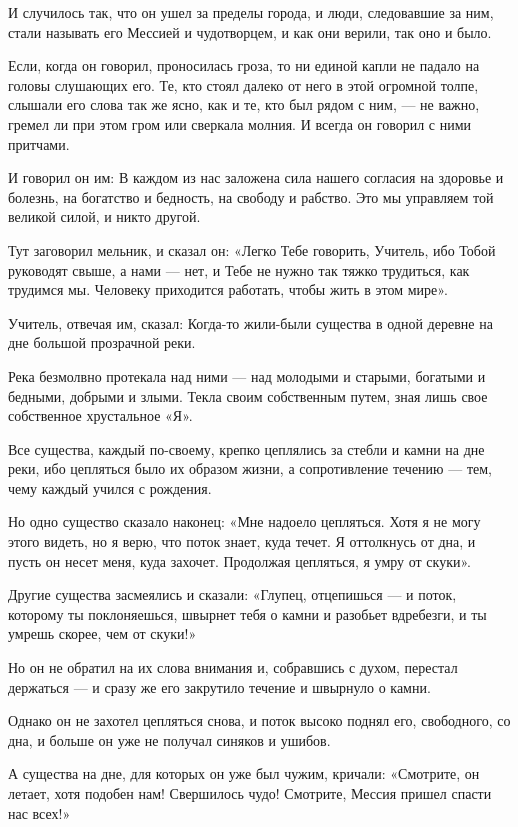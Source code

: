 И случилось так, что он ушел за пределы города, и люди, следовавшие за ним, стали называть его Мессией и чудотворцем, и как они верили, так оно и было.

Если, когда он говорил, проносилась гроза, то ни единой капли не падало на головы слушающих его. Те, кто стоял далеко от него в этой огромной толпе, слышали его слова так же ясно, как и те, кто был рядом с ним, --- не важно, гремел ли при этом гром или сверкала молния. И всегда он говорил с ними притчами.

И говорил он им: В каждом из нас заложена сила нашего согласия на здоровье и болезнь, на богатство и бедность, на свободу и рабство. Это мы управляем той великой силой, и никто другой.

Тут заговорил мельник, и сказал он: «Легко Тебе говорить, Учитель, ибо Тобой руководят свыше, а нами --- нет, и Тебе не нужно так тяжко трудиться, как трудимся мы. Человеку приходится работать, чтобы жить в этом мире».

Учитель, отвечая им, сказал: Когда-то жили-были существа в одной деревне на дне большой прозрачной реки.

Река безмолвно протекала над ними --- над молодыми и старыми, богатыми и бедными, добрыми и злыми. Текла своим собственным путем, зная лишь свое собственное хрустальное «Я».

Все существа, каждый по-своему, крепко цеплялись за стебли и камни на дне реки, ибо цепляться было их образом жизни, а сопротивление течению --- тем, чему каждый учился с рождения.

Но одно существо сказало наконец: «Мне надоело цепляться. Хотя я не могу этого видеть, но я верю, что поток знает, куда течет. Я оттолкнусь от дна, и пусть он несет меня, куда захочет. Продолжая цепляться, я умру от скуки».

Другие существа засмеялись и сказали: «Глупец, отцепишься --- и поток, которому ты поклоняешься, швырнет тебя о камни и разобьет вдребезги, и ты умрешь скорее, чем от скуки!»

Но он не обратил на их слова внимания и, собравшись с духом, перестал держаться --- и сразу же его закрутило течение и швырнуло о камни.

Однако он не захотел цепляться снова, и поток высоко поднял его, свободного, со дна, и больше он уже не получал синяков и ушибов.

А существа на дне, для которых он уже был чужим, кричали: «Смотрите, он летает, хотя подобен нам! Свершилось чудо! Смотрите, Мессия пришел спасти нас всех!»

